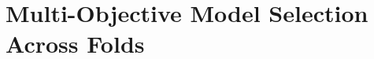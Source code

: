 \documentclass[12pt, draft]{article}
\theoremstyle{plain}
\theoremstyle{definition}
\newcommand{\1}{\mathbf{1}}
\begin{document}











\section{Multi-Objective Model Selection Across Folds}
\label{subsec:model_selection}
\end{document}
